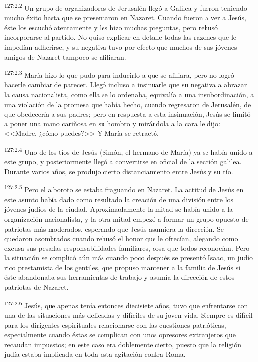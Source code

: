 \par 
\textsuperscript{127:2.2} Un grupo de organizadores de Jerusalén llegó a Galilea y fueron teniendo mucho éxito hasta que se presentaron en Nazaret. Cuando fueron a ver a Jesús, éste los escuchó atentamente y les hizo muchas preguntas, pero rehusó incorporarse al partido. No quiso explicar en detalle todas las razones que le impedían adherirse, y su negativa tuvo por efecto que muchos de sus jóvenes amigos de Nazaret tampoco se afiliaran.

\par 
\textsuperscript{127:2.3} María hizo lo que pudo para inducirlo a que se afiliara, pero no logró hacerle cambiar de parecer. Llegó incluso a insinuarle que su negativa a abrazar la causa nacionalista, como ella se lo ordenaba, equivalía a una insubordinación, a una violación de la promesa que había hecho, cuando regresaron de Jerusalén, de que obedecería a sus padres; pero en respuesta a esta insinuación, Jesús se limitó a poner una mano cariñosa en su hombro y mirándola a la cara le dijo: <<Madre, ¿cómo puedes?>> Y María se retractó.

\par 
\textsuperscript{127:2.4} Uno de los tíos de Jesús (Simón, el hermano de María) ya se había unido a este grupo, y posteriormente llegó a convertirse en oficial de la sección galilea. Durante varios años, se produjo cierto distanciamiento entre Jesús y su tío.

\par 
\textsuperscript{127:2.5} Pero el alboroto se estaba fraguando en Nazaret. La actitud de Jesús en este asunto había dado como resultado la creación de una división entre los jóvenes judíos de la ciudad. Aproximadamente la mitad se había unido a la organización nacionalista, y la otra mitad empezó a formar un grupo opuesto de patriotas más moderados, esperando que Jesús asumiera la dirección. Se quedaron asombrados cuando rehusó el honor que le ofrecían, alegando como excusa sus pesadas responsabilidades familiares, cosa que todos reconocían. Pero la situación se complicó aún más cuando poco después se presentó Isaac, un judío rico prestamista de los gentiles, que propuso mantener a la familia de Jesús si éste abandonaba sus herramientas de trabajo y asumía la dirección de estos patriotas de Nazaret.

\par 
\textsuperscript{127:2.6} Jesús, que apenas tenía entonces diecisiete años, tuvo que enfrentarse con una de las situaciones más delicadas y difíciles de su joven vida. Siempre es difícil para los dirigentes espirituales relacionarse con las cuestiones patrióticas, especialmente cuando éstas se complican con unos opresores extranjeros que recaudan impuestos; en este caso era doblemente cierto, puesto que la religión judía estaba implicada en toda esta agitación contra Roma.

